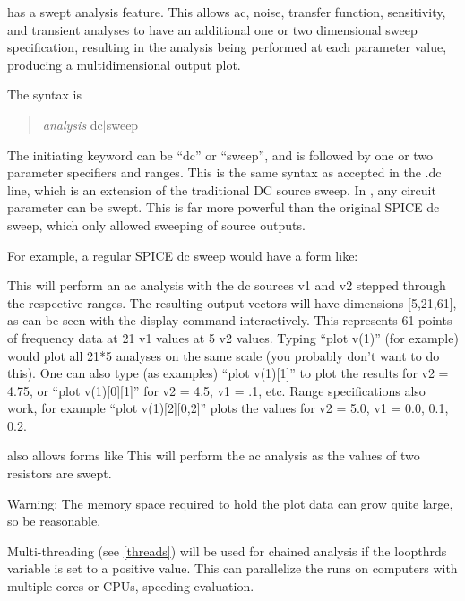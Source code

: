{\WRspice} has a swept analysis feature.  This allows ac, noise,
transfer function, sensitivity, and transient analyses to have an
additional one or two dimensional sweep specification, resulting in
the analysis being performed at each parameter value, producing a
multidimensional output plot.

The syntax is
\begin{quote}
{\it analysis} {\vt dc}$|${\vt sweep} \swspec
\end{quote}

The initiating keyword can be ``{\vt dc}'' or ``{\vt sweep}'', and is
followed by one or two parameter specifiers and ranges.  This is the
same syntax as accepted in the {\WRspice} {\vt .dc} line, which is an
extension of the traditional DC source sweep.  In {\WRspice}, any
circuit parameter can be swept.  This is far more powerful than the
original SPICE dc sweep, which only allowed sweeping of source
outputs.

For example, a regular SPICE dc sweep would have a form like:

This will perform an ac analysis with the dc sources {\vt v1} and {\vt
v2} stepped through the respective ranges.  The resulting output
vectors will have dimensions [5,21,61], as can be seen with the {\et
display} command interactively.  This represents 61 points of
frequency data at 21 {\vt v1} values at 5 {\vt v2} values.  Typing
``{\vt plot v(1)}'' (for example) would plot all 21*5 analyses on the
same scale (you probably don't want to do this).  One can also type
(as examples) ``{\vt plot v(1)[1]}'' to plot the results for {\vt v2}
= 4.75, or ``{\vt plot v(1)[0][1]}'' for {\vt v2} = 4.5, {\vt v1} =
.1, etc.  Range specifications also work, for example ``{\vt plot
v(1)[2][0,2]}'' plots the values for {\vt v2} = 5.0, {\vt v1} = 0.0,
0.1, 0.2.

{\WRspice} also allows forms like
This will perform the ac analysis as the values of two resistors
are swept.

Warning:  The memory space required to hold the plot data can grow
quite large, so be reasonable.

Multi-threading (see \ref{threads}) will be used for chained analysis
if the {\et loopthrds} variable is set to a positive value.  This can
parallelize the runs on computers with multiple cores or CPUs,
speeding evaluation.

